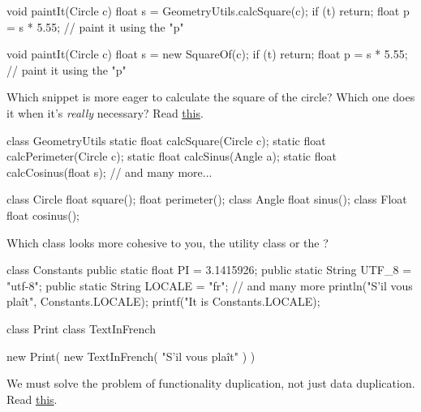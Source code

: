 \documentclass{article}
\begin{document}
\begin{pptWide}{2}
{\small\begin{ffcode}
void paintIt(Circle c) {
  float s = GeometryUtils.calcSquare(c);
  if (t) { return; }
  float p = s * 5.55;
  // paint it using the "p"
}
\end{ffcode}
}
\par\columnbreak\par
{\small\begin{ffcode}
void paintIt(Circle c) {
  float s = new SquareOf(c);
  if (t) { return; }
  float p = s * 5.55;
  // paint it using the "p"
}
\end{ffcode}
}
\end{pptWide}
\par
Which snippet is more eager to calculate the square of the circle? Which one does it when it's \emph{really} necessary?
Read \href{https://www.yegor256.com/2015/02/26/composable-decorators.html}{this}.
\plush{}

\begin{pptWide}{2}
{\small\begin{ffcode}
class GeometryUtils {
  static float calcSquare(Circle c);
  static float calcPerimeter(Circle c);
  static float calcSinus(Angle a);
  static float calcCosinus(float s);
  // and many more...
}
\end{ffcode}
}
\par\columnbreak\par
{\small\begin{ffcode}
class Circle {
  float square();
  float perimeter();
}
class Angle {
  float sinus();
}
class Float {
  float cosinus();
}
\end{ffcode}
}
\end{pptWide}
\par
Which class looks more cohesive to you, the utility class  or the ?
\plush{}


\begin{pptWide}{2}
{\small\begin{ffcode}
class Constants {
  public static float PI = 3.1415926;
  public static String UTF_8 = "utf-8";
  public static String LOCALE = "fr";
  // and many more
}
println("S'il vous plaît",
  Constants.LOCALE);
printf("It is %
  Constants.LOCALE);
\end{ffcode}
}
\par\columnbreak\par
{\small\begin{ffcode}
class Print { }
class TextInFrench { }

new Print(
  new TextInFrench(
    "S'il vous plaît"
  )
)
\end{ffcode}
}
\end{pptWide}
\par
We must solve the problem of functionality duplication, not just data duplication.
Read \href{https://www.yegor256.com/2015/07/06/public-static-literals.html}{this}.
\plush{}
\end{document}

